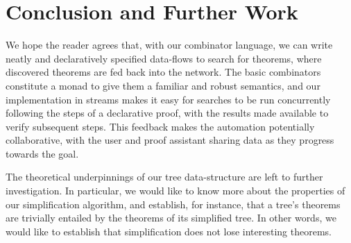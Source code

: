 



\section{Conclusion and Further Work}
We hope the reader agrees that, with our combinator language, we can write neatly and declaratively specified data-flows to search for theorems, where discovered theorems are fed back into the network. The basic combinators constitute a monad to give them a familiar and robust semantics, and our implementation in streams makes it easy for searches to be run concurrently following the steps of a declarative proof, with the results made available to verify subsequent steps. This feedback makes the automation potentially collaborative, with the user and proof assistant sharing data as they progress towards the goal.

The theoretical underpinnings of our tree data-structure are left to further investigation. In particular, we would like to know more about the properties of our simplification algorithm, and establish, for instance, that a tree's theorems are trivially entailed by the theorems of its simplified tree. In other words, we would like to establish that simplification does not lose interesting theorems.

